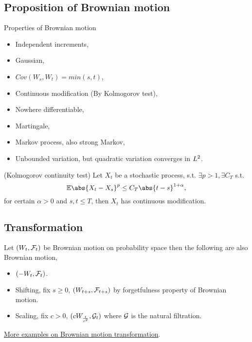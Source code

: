 \subsection{Proposition of Brownian motion}
\begin{prop}Properties of Brownian motion

\begin{itemize}
    \item Independent increments,
    \item Gaussian,
    \item $Cov(W_s, W_t) = min(s,t)$,
    \item Continuous modification (By Kolmogorov test),
    \item Nowhere differentiable,
    \item Martingale,
    \item Markov process, also strong Markov,
    \item Unbounded variation, but quadratic variation converges in $L^{2}$.
\end{itemize}
\end{prop}

\begin{thm}{(Kolmogorov continuity test)} Let $X_t$ be a stochastic process, s.t. $\exists p > 1, \exists C_T$ s.t.
\begin{equation*}
    \E \abs{X_t - X_s}^p \leq  C_T\abs{t-s}^{1+\alpha},
\end{equation*} for certain $\alpha >0$ and $s,t\leq T$, then $X_t $ has continuous modification.
\end{thm}

\subsection{Transformation}
Let $(W_t, \mathcal{F}_t)$ be Brownian motion on probability space then the following are also Brownian motion,
\begin{itemize}
    \item $(-W_t, \mathcal{F}_t)$.
    \item Shifting, fix $s\geq 0$, $(W_{t+s}, \mathcal{F}_{t+s})$ by forgetfulness property of Brownian motion.
    \item Scaling, fix $c > 0$, $(cW_{\frac{t}{c^2}}, \mathcal{G}_t)$ where $\mathcal{G}$ is the natural filtration.
\end{itemize}
\href{https://www.randomservices.org/random/brown/Standard.html}{More examples on Brownian motion transformation}.

